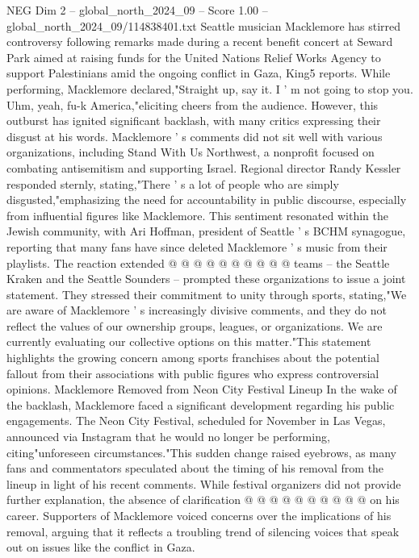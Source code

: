 \begin{textsample}{NEG Dim 2 – global\_north\_2024\_09 – Score 1.00 – global\_north\_2024\_09/114838401.txt}  \label{ex:f2_neg_038}
Seattle musician Macklemore has stirred controversy following remarks made during a recent benefit concert at Seward Park aimed at raising funds for the United Nations Relief Works Agency to support Palestinians amid the ongoing conflict in Gaza, King5 reports.
While performing, Macklemore declared,"Straight up, say it.
I ' m not going to stop you.
Uhm, yeah, fu-k America,"eliciting cheers from the audience.
However, this outburst has ignited significant backlash, with many critics expressing their disgust at his words.
Macklemore ' s comments did not sit well with various organizations, including Stand With Us Northwest, a nonprofit focused on combating antisemitism and supporting Israel.
Regional director Randy Kessler responded sternly, stating,"There ' s a lot of people who are simply disgusted,"emphasizing the need for accountability in public discourse, especially from influential figures like Macklemore.
This sentiment resonated within the Jewish community, with Ari Hoffman, president of Seattle ' s BCHM synagogue, reporting that many fans have since deleted Macklemore ' s music from their playlists.
The reaction extended @ @ @ @ @ @ @ @ @ @ teams -- the Seattle Kraken and the Seattle Sounders -- prompted these organizations to issue a joint statement.
They stressed their commitment to unity through sports, stating,"We are aware of Macklemore ' s increasingly divisive comments, and they do not reflect the values of our ownership groups, leagues, or organizations.
We are currently evaluating our collective options on this matter."This statement highlights the growing concern among sports franchises about the potential fallout from their associations with public figures who express controversial opinions.
Macklemore Removed from Neon City Festival Lineup In the wake of the backlash, Macklemore faced a significant development regarding his public engagements.
The Neon City Festival, scheduled for November in Las Vegas, announced via Instagram that he would no longer be performing, citing"unforeseen circumstances."This sudden change raised eyebrows, as many fans and commentators speculated about the timing of his removal from the lineup in light of his recent comments.
While festival organizers did not provide further explanation, the absence of clarification @ @ @ @ @ @ @ @ @ @ on his career.
Supporters of Macklemore voiced concerns over the implications of his removal, arguing that it reflects a troubling trend of silencing voices that speak out on issues like the conflict in Gaza.

\end{textsample}
